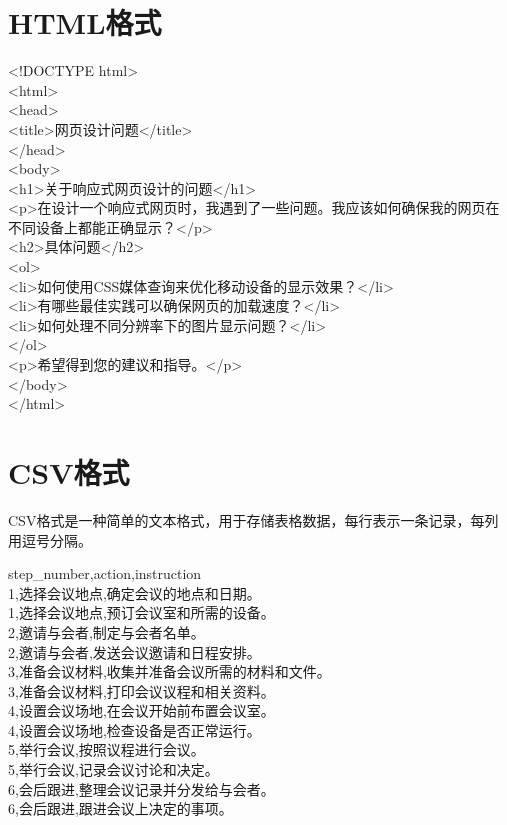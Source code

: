 \documentclass[12pt]{book}
\begin{document}
\section{HTML格式}

<!DOCTYPE html>\\
<html>\\
<head>\\
<title>网页设计问题</title>\\
</head>\\
<body>\\

<h1>关于响应式网页设计的问题</h1>\\

<p>在设计一个响应式网页时，我遇到了一些问题。我应该如何确保我的网页在不同设备上都能正确显示？</p>\\

<h2>具体问题</h2>\\

<ol>\\
<li>如何使用CSS媒体查询来优化移动设备的显示效果？</li>\\
<li>有哪些最佳实践可以确保网页的加载速度？</li>\\
<li>如何处理不同分辨率下的图片显示问题？</li>\\
</ol>\\

<p>希望得到您的建议和指导。</p>\\

</body>\\
</html>\\


\section{CSV格式}
CSV格式是一种简单的文本格式，用于存储表格数据，每行表示一条记录，每列用逗号分隔。


\begin{tcolorbox}
step\_number,action,instruction\\
1,选择会议地点,确定会议的地点和日期。\\
1,选择会议地点,预订会议室和所需的设备。\\
2,邀请与会者,制定与会者名单。\\
2,邀请与会者,发送会议邀请和日程安排。\\
3,准备会议材料,收集并准备会议所需的材料和文件。\\
3,准备会议材料,打印会议议程和相关资料。\\
4,设置会议场地,在会议开始前布置会议室。\\
4,设置会议场地,检查设备是否正常运行。\\
5,举行会议,按照议程进行会议。\\
5,举行会议,记录会议讨论和决定。\\
6,会后跟进,整理会议记录并分发给与会者。\\
6,会后跟进,跟进会议上决定的事项。\\

\end{tcolorbox}	
\end{document}
